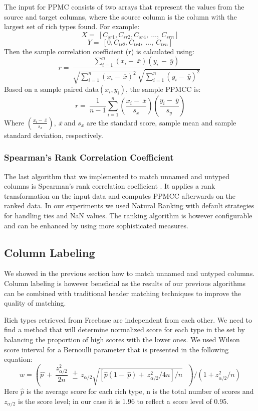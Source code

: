 \documentclass{sig-alternate}
\begin{document}
The input for PPMC consists of two arrays that represent the values from the source and target columns, where the source column is the column with the largest set of rich types found. For example:
\[X=\ \left[C_{sr1},C_{sr2},C_{sr4},\ \dots ,\ C_{srn}\right]\]
\[Y=\ \left[0,C_{tr2},C_{tr4},\ \dots ,\ C_{trn}\right]\]
Then the sample correlation coefficient (r) is calculated using:
\[r=\ \frac{\sum^n_{i=1}{\left(x_i-\ \overline{x}\right)\left(y_{i\ }-\ \overline{y}\right)}}{\sqrt{\sum^n_{i=1}{{\left(x_i-\ \overline{x}\right)}^{2\ }}}\sqrt{\sum^n_{i=1}{{\left(y_i-\ \overline{y}\right)}^2}}}\ \]
Based on a sample paired data$\left(x_i,y_i\right)$, the sample PPMCC is:
\[r=\ \frac{1}{n-1}\sum^n_{i=1}{\left(\frac{x_i-\ \overline{x}}{s_x}\right)}\left(\frac{y_i-\ \overline{y}}{s_y}\right)\]
Where $\left(\frac{x_i-\ \overline{x}}{s_x}\right),\ \overline{x\ }$and $s_x$ are the standard score, sample mean and sample standard deviation, respectively.


\subsubsection{Spearman's Rank Correlation Coefficient}
The last algorithm that we implemented to match unnamed and untyped columns is Spearman's rank correlation coefficient \cite{books/daglib/0020904}. It applies a rank transformation on the input data and computes PPMCC afterwards on the ranked data. In our experiments we used Natural Ranking with default strategies for handling ties and NaN values. The ranking algorithm is however configurable and can be enhanced by using more sophisticated measures.


\subsection{Column Labeling}
We showed in the previous section how to match unnamed and untyped columns. Column labeling is however beneficial as the results of our previous algorithms can be combined with traditional header matching techniques to improve the quality of matching.

Rich types retrieved from Freebase are independent from each other. We need to find a method that will determine normalized score for each type in the set by balancing the proportion of high scores with the lower ones. We used Wilson score interval for a Bernoulli parameter that is presented in the following equation:
\[w={\left(\widehat{p\ }+\ \frac{z^2_{{\alpha }/{2}}}{2n}\  \begin{array}{c}
+ \\
- \end{array}
z_{{\alpha }/{2}}\sqrt{{\left[\hat{p}\left(1-\ \hat{p}\right)+\ {z^2_{{\alpha }/{2}}}/{4n}\right]}/{n}}\ \ \ \right)}/{\left(1+{z^2_{{\alpha }/{2}}}/{n}\right)}\]
Here $\hat{p}$ is the average score for each rich type, n is the total number of scores and $z_{{\alpha }/{2}}$ is the score level; in our case it is 1.96 to reflect a score level of 0.95.
\end{document}
